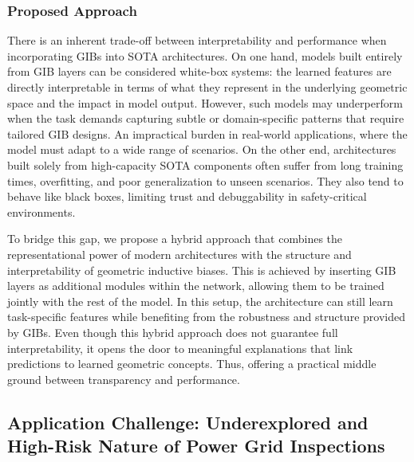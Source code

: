 \subsubsection{Proposed Approach}
%
There is an inherent trade-off between interpretability and performance when
incorporating GIBs into SOTA architectures. On one hand, models built entirely
from GIB layers can be considered white-box systems: the learned features are
directly interpretable in terms of what they represent in the underlying
geometric space and the impact in model output.
%
However, such models may underperform when the task demands capturing subtle or
domain-specific patterns that require tailored GIB designs. An impractical
burden in real-world applications, where the model must adapt to a wide range
of scenarios.
%
On the other end, architectures built solely from high-capacity SOTA components
often suffer from long training times, overfitting, and poor generalization to
unseen scenarios. They also tend to behave like black boxes, limiting trust and
debuggability in safety-critical environments.
%

To bridge this gap, we propose a hybrid approach that combines the
representational power of modern architectures with the structure and
interpretability of geometric inductive biases.
%
This is achieved by inserting GIB layers as additional modules within the
network, allowing them to be trained jointly with the rest of the model. In
this setup, the architecture can still learn task-specific features while
benefiting from the robustness and structure provided by GIBs.
%
Even though this hybrid approach does not guarantee full interpretability, it
opens the door to meaningful explanations that link predictions to learned
geometric concepts. Thus, offering a practical middle ground between
transparency and performance.

\subsection{Application Challenge: Underexplored and High-Risk Nature of Power Grid Inspections}

